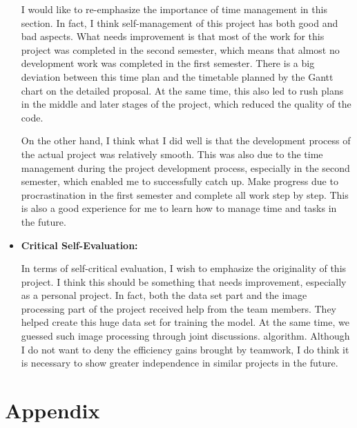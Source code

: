 \documentclass[twocolumn]{article}
\begin{document}
\begin{itemize}
    I would like to re-emphasize the importance of time management in this section. In fact, I think self-management of this project has both good and bad aspects. What needs improvement is that most of the work for this project was completed in the second semester, which means that almost no development work was completed in the first semester. There is a big deviation between this time plan and the timetable planned by the Gantt chart on the detailed proposal. At the same time, this also led to rush plans in the middle and later stages of the project, which reduced the quality of the code.

    On the other hand, I think what I did well is that the development process of the actual project was relatively smooth. This was also due to the time management during the project development process, especially in the second semester, which enabled me to successfully catch up. Make progress due to procrastination in the first semester and complete all work step by step. This is also a good experience for me to learn how to manage time and tasks in the future.

    \item \textbf{Critical Self-Evaluation: }
    
    In terms of self-critical evaluation, I wish to emphasize the originality of this project. I think this should be something that needs improvement, especially as a personal project. In fact, both the data set part and the image processing part of the project received help from the team members. They helped create this huge data set for training the model. At the same time, we guessed such image processing through joint discussions. algorithm. Although I do not want to deny the efficiency gains brought by teamwork, I do think it is necessary to show greater independence in similar projects in the future.

\end{itemize}

\newpage



\newpage
\onecolumn
\section{Appendix}
\end{document}
